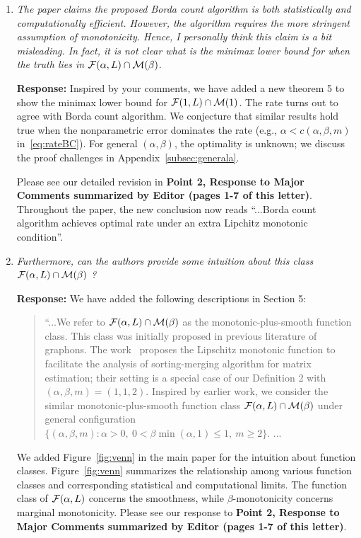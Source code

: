\documentclass[11pt]{article}
\theoremstyle{plain}
\theoremstyle{definition}
\begin{document}
\begin{enumerate}[wide, labelwidth=!, labelindent=0pt]
    \item \textit{The paper claims the proposed Borda count algorithm is both statistically and computationally efficient. However, the algorithm requires the more stringent assumption of monotonicity. Hence, I personally think this claim is a bit misleading. In fact, it is not clear what is the minimax lower bound for when the truth lies in $\mathcal{F}(\alpha, L) \cap \mathcal{M}(\beta)$.  }
    
    
    \textbf{Response:} 
    Inspired by your comments, we have added a new theorem 5 to show the minimax lower bound for $\mathcal{F}(1,L)\cap \mathcal{M}(1)$. The rate turns out to agree with Borda count algorithm. We conjecture that similar results hold true when the nonparametric error dominates the rate (e.g., $\alpha<c(\alpha,\beta,m)$ in~\eqref{eq:rateBC}). For general $(\alpha,\beta)$, the optimality is unknown; we discuss the proof challenges in Appendix~\ref{subsec:generala}.  



   
Please see our detailed revision in \textbf{Point 2, Response to Major Comments summarized by Editor (pages 1-7 of this letter)}. Throughout the paper, 
the new conclusion now reads ``...Borda count algorithm achieves optimal rate {\color{blue}under an extra Lipchitz monotonic condition''}.      

     \item \textit{Furthermore, can the authors provide some intuition about this class $\mathcal{F}(\alpha, L) \cap \mathcal{M}(\beta)$ ? }
     
     \textbf{Response: } We have added the following descriptions in Section 5:
\begin{quote}
\color{blue}
``...We refer to $\mathcal{F}(\alpha,L)\cap \mathcal{M}(\beta)$ as the monotonic-plus-smooth function class. This class was initially proposed in previous literature of graphons. The work~\citep{chan2014consistent} proposes the Lipschitz monotonic function to facilitate the analysis of sorting-merging algorithm for matrix estimation; their setting is a special case of our Definition 2 with $(\alpha,\beta,m)=(1,1,2)$. Inspired by earlier work, we consider the similar monotonic-plus-smooth function class $\mathcal{F}(\alpha,L)\cap \mathcal{M}(\beta)$ under general configuration $\{(\alpha,\beta,m): \alpha>0,\ 0<\beta\min(\alpha,1)\leq 1, \ m\geq 2\}$. ...
\end{quote}

     We added Figure~\ref{fig:venn} in the main paper for the intuition about function classes. Figure~\ref{fig:venn} summarizes the relationship among various function classes and corresponding statistical and computational limits. The function class of $\mathcal{F}(\alpha,L)$ concerns the smoothness, while $\beta$-monotonicity concerns marginal monotonicity. Please see our response to {\bf Point 2, Response to Major Comments summarized by Editor (pages 1-7 of this letter)}. 
     

\end{enumerate}
\end{document}
